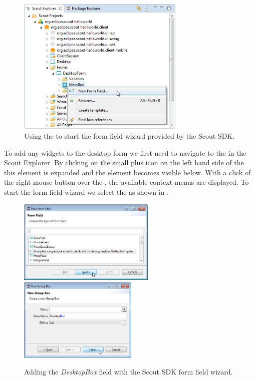 \documentclass[a4paper,10pt,twoside]{book}
\begin{document}
\begin{figure}
\includegraphics[width=8cm]{sdk_new_field_wizard_menu.png} 
\caption{Using the  to start the form field wizard provided by the Scout SDK.}
\end{figure}

To add any widgets to the desktop form we first need to navigate to the  in the Scout Explorer.
By clicking on the small plus icon on the left hand side of the  this element is expanded and the  element becomes visible below.
With a click of the right mouse button over the , the available context menus are displayed.
To start the form field wizard we select the  as shown in .

\begin{figure}
\includegraphics[height=4cm]{sdk_new_field_groupbox_1.png} \hspace{8mm}
\includegraphics[height=4cm]{sdk_new_field_groupbox_2.png}
\caption{Adding the \textit{DesktopBox} field with the Scout SDK form field wizard.}
\end{figure}
\end{document}
